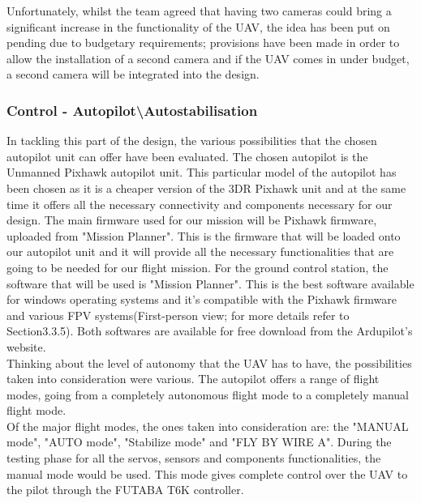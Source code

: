 \documentclass[12pt]{article}
\begin{document}
\noindent Unfortunately, whilst the team agreed that having two cameras could bring a significant increase in the functionality of the UAV, the idea has been put on pending due to budgetary requirements; provisions have been made in order to allow the installation of a second camera and if the UAV comes in under budget, a second camera will be integrated into the design. \\

\subsubsection{Control - Autopilot\textbackslash Autostabilisation}

\noindent In tackling this part of the design, the various possibilities that the chosen autopilot unit can offer have been evaluated.  The chosen autopilot is the Unmanned Pixhawk autopilot unit. This particular model of the autopilot has been chosen as it is a cheaper version of the 3DR Pixhawk unit and at the same time it offers all the necessary connectivity and components necessary for our design. \cite{CONTROL1} The main firmware used for our mission will be Pixhawk firmware, uploaded from "Mission Planner". This is the firmware that will be loaded onto our autopilot unit and it will provide all the necessary functionalities that are going to be needed for our flight mission. For the ground control station, the software that will be used is "Mission Planner". This is the best software available for windows operating systems and it's compatible with the Pixhawk firmware and various FPV systems(First-person view; for more details refer to Section3.3.5). Both softwares are available for free download from the Ardupilot's website.\cite{CONTROL2} \\

\noindent Thinking about the level of autonomy that the UAV has to have, the possibilities taken into consideration were various. The autopilot offers a range of flight modes, going from a completely autonomous flight mode to a completely manual flight mode. \\

\noindent Of the major flight modes, the ones taken into consideration are: the "MANUAL mode", "AUTO mode", "Stabilize mode" and "FLY BY WIRE A". During the testing phase for all the servos, sensors and components functionalities, the manual mode would be used. This mode gives complete control over the UAV to the pilot through the FUTABA T6K controller. \cite{CONTROL3} \\
\end{document}
